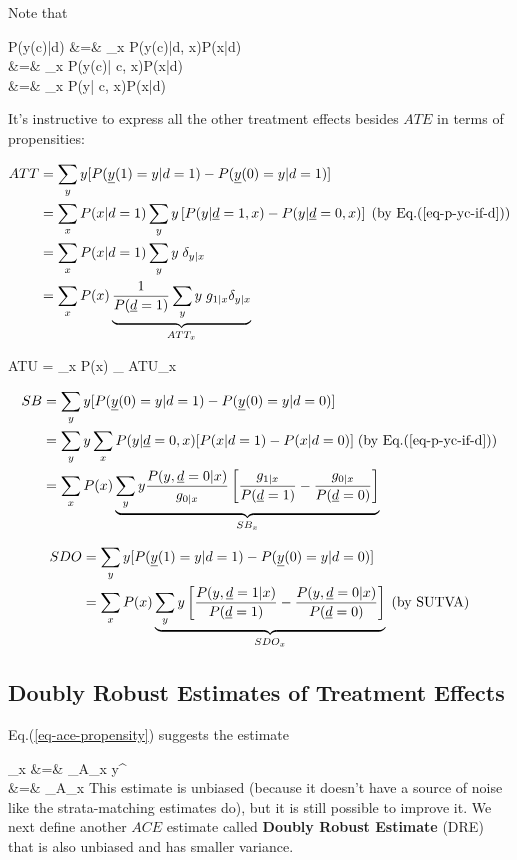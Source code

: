 Note that

\beqa
P(y(c)|d)
&=&
\sum_x P(y(c)|d, x)P(x|d)
\\
&=&
\sum_x P(y(c)| c, x)P(x|d) \;
\\
&=&
\sum_x P(y| c, x)P(x|d)\;
\label{eq-p-yc-if-d}
\eeqa

It's
instructive
to express all the
other treatment effects besides
$ATE$ in terms of propensities:

\begin{align}
ATT
&=
 \sum_y y [P(\rvy(1)=y|d=1)
-P(\rvy(0)=y|d=1)]
\\
&=
\sum_x P(x|d=1)
\sum_y y
\left[
P(y|\rvd=1,x)
-
P(y|\rvd=0,x)
\right]
\;\text{(by Eq.(\ref{eq-p-yc-if-d}))}
\\
&=
\sum_x P(x|d=1)
\sum_y y \;\delta_{y|x}
\\
&=
\sum_x P(x)
\underbrace{
\frac{1}{P(\rvd=1)}
\sum_y y\; g_{1|x}\delta_{y|x}
}_
{ATT_x}
\end{align}

\beq
ATU
=
\sum_x P(x)
_
{ATU_x}
\eeq

\begin{align}
SB&= \sum_y y
[P(\rvy(0)=y|d=1)-P(\rvy(0)=y|d=0)]
\\
&=
\sum_y y
\sum_x P(y| \rvd=0,x)
[
P(x|d=1)-P(x|d=0)]
\;\text{(by Eq.(\ref{eq-p-yc-if-d}))}
\\
&=
\sum_x P(x)
\underbrace{\sum_y y
\frac{P(y, \rvd=0|x)}{g_{0|x}}
\left[
\frac{g_{1|x}}{P(\rvd=1)}
-
\frac{g_{0|x}}{P(\rvd=0)}
\right]}_{SB_x}
\end{align}

\begin{align}
SDO
&=
\sum_y y
[P(\rvy(1)=y|d=1)-P(\rvy(0)=y|d=0)]
\\
&=
\sum_x P(x)
\underbrace{\sum_y y
\left[
\frac{P(y, \rvd=1|x)}{P(\rvd=1)}
-
\frac{P(y, \rvd=0|x)}{P(\rvd=0)}
\right]}_{SDO_x}
\;\text{(by SUTVA)}
\end{align}



\subsection{Doubly Robust Estimates of Treatment Effects}



Eq.(\ref{eq-ace-propensity})
 suggests the estimate

\beqa
{}_x
&=&
\sum_{\s\in A_x}
y^\s
{}
\\
&=&
\sum_{\s \in A_x}
\label{eq-ace-esti-posi}
\eeqa
This
estimate is unbiased
(because it doesn't
have a source
of noise like the
strata-matching
estimates do),
but it is still possible to
improve it.
We next
define
another $ACE$ estimate
called
{\bf Doubly Robust Estimate} (DRE)
that is also
unbiased and has smaller
variance.

